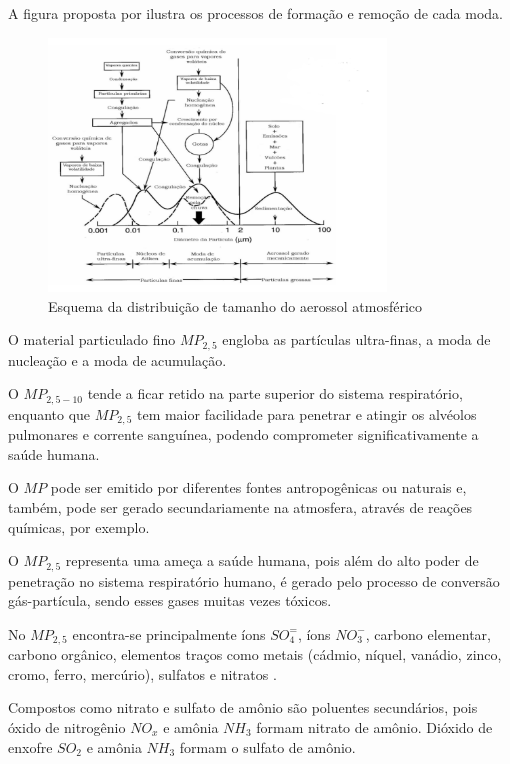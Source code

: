 A figura proposta por \citep{finlayson1999} ilustra os processos de 
formação e remoção de cada moda. 

\begin{figure}[H]
\begin{center}
  \includegraphics[width=0.8\textwidth]{../inputs/images/modas_aerossol.png}
  \caption{Esquema da distribuição de tamanho do aerossol atmosférico 
           \citep{finlayson1999} \label{fig:modas_aerossol}}
\end{center}
\end{figure}

O material particulado fino $MP_{2,5}$ engloba as partículas 
ultra-finas, a moda de nucleação e a moda de acumulação.  

O $MP_{2,5-10}$ tende a ficar retido na parte superior do sistema respiratório, 
enquanto que $MP_{2,5}$ tem maior facilidade para penetrar e atingir 
os alvéolos pulmonares e corrente sanguínea, 
podendo comprometer significativamente a saúde humana. 

O $MP$ pode ser emitido por diferentes fontes antropogênicas ou naturais e, 
também, pode ser gerado secundariamente na atmosfera, através de 
reações químicas, por exemplo. 

O $MP_{2,5}$ representa uma ameça a saúde humana, pois além 
do alto poder de penetração no sistema respiratório humano,
é gerado pelo processo de conversão gás-partícula, sendo esses 
gases muitas vezes tóxicos.

No $MP_{2,5}$ encontra-se principalmente íons $SO_4^=$, 
íons $ NO_3^-$, carbono elementar, carbono orgânico, 
elementos traços como metais 
(cádmio, níquel, vanádio, zinco, cromo, ferro, mercúrio), 
sulfatos e nitratos \citep{finlayson1999}. 

Compostos como nitrato e sulfato de amônio são poluentes secundários,
pois óxido de nitrogênio $NO_x$ e amônia $NH_3$ formam nitrato de amônio. 
Dióxido de enxofre $SO_2$ e amônia $NH_3$ formam o sulfato de amônio. 

